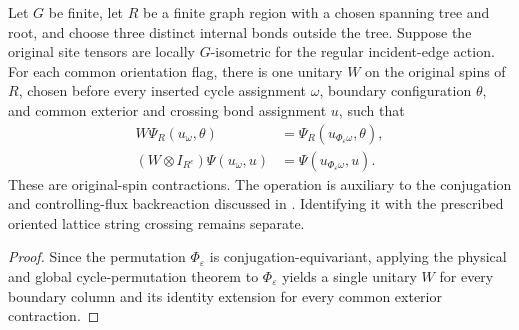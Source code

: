 \begin{lemma}%
    \label{thm:peps_regular_three_plaquette_double_exchange_physical}
    \leanok
    Let $G$ be finite, let $R$ be a finite graph region with a chosen spanning
    tree and root, and choose three distinct internal bonds outside the tree.
    Suppose the original site tensors are locally $G$-isometric for the
    regular incident-edge action. For each common orientation flag, there is
    one unitary $W$ on the original spins of $R$, chosen before every inserted
    cycle assignment $\omega$, boundary configuration $\theta$, and common
    exterior and crossing bond assignment $u$, such that
    \begin{align}
        W\Psi_R(u_\omega,\theta)
         & =\Psi_R(u_{\Phi_\varepsilon\omega},\theta), \\
        (W\otimes I_{R^c})\Psi(u_\omega,u)
         & =\Psi(u_{\Phi_\varepsilon\omega},u).
    \end{align}
    These are original-spin contractions. The operation is auxiliary to
    the conjugation and controlling-flux backreaction discussed in
    \cite[Section 6.6]{Schuch2010PEPS}. Identifying it with the prescribed
    oriented lattice string crossing remains separate.
\end{lemma}
\begin{proof}\leanok
    Since the permutation $\Phi_\varepsilon$ is conjugation-equivariant,
    applying the physical and global cycle-permutation theorem to
    $\Phi_\varepsilon$ yields a single unitary $W$ for every boundary column
    and its identity extension for every common exterior contraction.
\end{proof}
